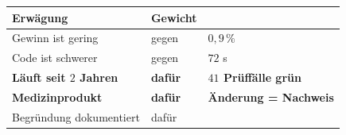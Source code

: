 \begin{technik}
\begin{center}
\renewcommand{\arraystretch}{1.5}
\begin{tabular}{@{}P{3.2cm}P{2.0cm}P{2.6cm}@{}}
\toprule
\textbf{Erwägung} & \textbf{Gewicht} & \\
\midrule
Gewinn ist gering & \textcolor{akzent}{gegen} & $0{,}9\,\%$\\
Code ist schwerer & \textcolor{akzent}{gegen} & $72$ s\\
\textbf{Läuft seit $2$ Jahren} & \textcolor{gruen}{\textbf{dafür}} & \textcolor{gruen}{\textbf{$41$ Prüffälle grün}}\\
\textbf{Medizinprodukt} & \textcolor{gruen}{\textbf{dafür}} & \textcolor{gruen}{\textbf{Änderung = Nachweis}}\\
Begründung dokumentiert & \textcolor{gruen}{dafür} & \\
\bottomrule
\end{tabular}
\end{center}

\begin{center}
\begin{minipage}{0.86\textwidth}
\end{minipage}
\end{center}
\end{technik}

